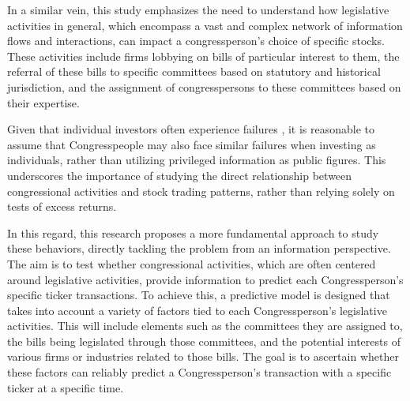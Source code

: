 \documentclass[15pt,letterpaper]{article}
\begin{document}
In a similar vein, this study emphasizes the need to understand how legislative activities in general, which encompass a vast and complex network of information flows and interactions, can impact a congressperson's choice of specific stocks. These activities include firms lobbying on bills of particular interest to them, the referral of these bills to specific committees based on statutory and historical jurisdiction, and the assignment of congresspersons to these committees based on their expertise.

Given that individual investors often experience failures \citep{barber2000,barberis2003}, it is reasonable to assume that Congresspeople may also face similar failures when investing as individuals, rather than utilizing privileged information as public figures. This underscores the importance of studying the direct relationship between congressional activities and stock trading patterns, rather than relying solely on tests of excess returns.





In this regard, this research proposes a more fundamental approach to study these behaviors, directly tackling the problem from an information perspective. The aim is to test whether congressional activities, which are often centered around legislative activities, provide information to predict each Congressperson's specific ticker transactions. To achieve this, a predictive model is designed that takes into account a variety of factors tied to each Congressperson's legislative activities. This will include elements such as the committees they are assigned to, the bills being legislated through those committees, and the potential interests of various firms or industries related to those bills. The goal is to ascertain whether these factors can reliably predict a Congressperson's transaction with a specific ticker at a specific time. 

\end{document}
